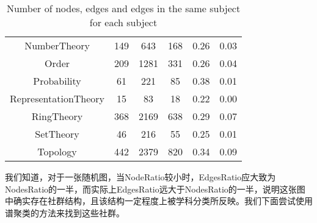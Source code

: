 \begin{table}[H]
\begin{tabular}{cccccc}
    NumberTheory & 149 & 643 & 168 & 0.26 & 0.03\\
    Order & 209 & 1281 & 331 & 0.26 & 0.04\\
    Probability & 61 & 221 & 85 & 0.38 & 0.01\\
    RepresentationTheory & 15 & 83 & 18 & 0.22 & 0.00\\
    RingTheory & 368 & 2169 & 638 & 0.29 & 0.07\\
    SetTheory & 46 & 216 & 55 & 0.25 & 0.01\\
    Topology & 442 & 2379 & 820 & 0.34 & 0.09\\
    \bottomrule
\end{tabular}
\caption{Number of nodes, edges and edges in the same subject for each subject}
\label{tab:Ratio}
\end{table}

我们知道，对于一张随机图，当NodeRatio较小时，EdgesRatio应大致为NodesRatio的一半，而实际上EdgesRatio远大于NodesRatio的一半，说明这张图中确实存在社群结构，且该结构一定程度上被学科分类所反映。我们下面尝试使用谱聚类的方法来找到这些社群。






